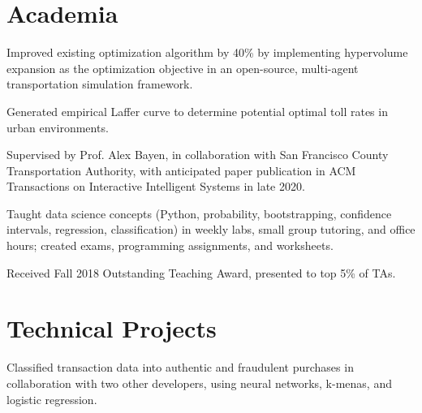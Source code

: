 \documentclass[]{single_column_resume}
\begin{document}

\section{Academia}

\noindent{}
\hfill {}
\begin{tightemize}
    \item Improved existing optimization algorithm by 40\% by implementing hypervolume expansion as the optimization objective in an open-source, multi-agent transportation simulation framework.
    \item Generated empirical Laffer curve to determine potential optimal toll rates in urban environments.
    \item Supervised by Prof. Alex Bayen, in collaboration with San Francisco County Transportation Authority, with anticipated paper publication in ACM Transactions on Interactive Intelligent Systems in late 2020.
\end{tightemize}
\sectionsep

\noindent{}
\hfill {}
\begin{tightemize}
    \item Taught data science concepts (Python, probability, bootstrapping, confidence intervals, regression, classification) in weekly labs, small group tutoring, and office hours; created exams, programming assignments, and worksheets.
    \item Received Fall 2018 Outstanding Teaching Award, presented to top 5\% of TAs.
\end{tightemize}
\sectionsep



\section{Technical Projects}
\hfill {}
\begin{tightemize}
   \item Classified transaction data into authentic and fraudulent purchases in collaboration with two other developers, using neural networks, k-menas, and logistic regression.
\end{tightemize}
\sectionsep
\end{document}
